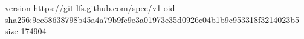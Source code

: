 version https://git-lfs.github.com/spec/v1
oid sha256:9ec58638798b45a4a79b9fe9e3a01973e35d0926c04b1b9c953318f3214023b5
size 174904
